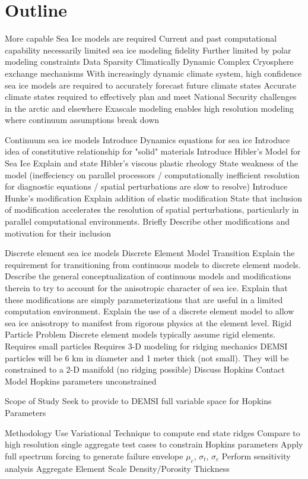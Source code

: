 \section{Outline}
\begin{outline}[enumerate]
\1 More capable Sea Ice models are required
\2 Current and past computational capability necessarily limited sea ice modeling fidelity
\3 Further limited by polar modeling constraints
\4 Data Sparsity
\4 Climatically Dynamic
\4 Complex Cryosphere exchange mechanisms
\2 With increasingly dynamic climate system, high confidence sea ice models are required to accurately forecast future climate states
\2 Accurate climate states required to effectively plan and meet National Security challenges in the arctic and elsewhere
\2 Exascale modeling enables high resolution modeling where continuum assumptions break down

\1 Continuum sea ice models
\2 Introduce Dynamics equations for sea ice
\3 Introduce idea of constitutive relationship for "solid" materials
\2 Introduce Hibler's Model for Sea Ice
\3 Explain and state Hibler's viscous plastic rheology
\3 State weakness of the model (ineffeciency on parallel processors / computationally inefficient resolution for diagnostic equations / spatial perturbations are slow to resolve)
\2 Introduce Hunke's modification
\3 Explain addition of elastic modification
\3 State that inclusion of modification accelerates the resolution of spatial perturbations, particularly in parallel computational environments.
\2 Briefly Describe other modifications and motivation for their inclusion

\1 Discrete element sea ice models
\2 Discrete Element Model Transition
\3 Explain the requirement for transitioning from continuous models to discrete element models.
\4 Describe the general conceptualization of continuous models and modifications therein to try to account for the anisotropic character of sea ice.
\4 Explain that these modifications are simply parameterizations that are useful in a limited computation environment.
\3 Explain the use of a discrete element model to allow sea ice anisotropy to manifest from rigorous physics at the element level.
\2 Rigid Particle Problem
\3 Discrete element models typically assume rigid elements.
\4 Requires small particles
\4 Requires 3-D modeling for ridging mechanics
\3 DEMSI particles will be 6 km in diameter and 1 meter thick (not small).  They will be constrained to a 2-D manifold (no ridging possible)
\2 Discuss Hopkins Contact Model
\2 Hopkins parameters unconstrained

\1 Scope of Study
\2 Seek to provide to DEMSI full variable space for Hopkins Parameters

\1 Methodology
\2 Use Variational Technique to compute end state ridges
\2 Compare to high resolution single aggregate test cases to constrain Hopkins parameters
\2 Apply full spectrum forcing to generate failure envelope
\3 $\mu_c$, $\sigma_t$, $\sigma_c$
\2 Perform sensitivity analysis
\3 Aggregate Element Scale
\3 Density/Porosity
\3 Thickness
\end{outline}
\pagebreak
